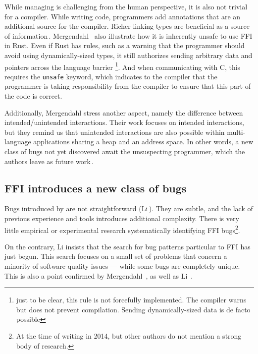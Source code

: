 \documentclass[nomenclature, english, bibtex]{kththesis}
\begin{document}
While managing  is challenging from the human perspective, it is also not trivial for a compiler. While writing code, programmers add annotations that are an additional source for the compiler. Richer linking types are beneficial as a source of information\,\cite{patterson_linking_2017}. Mergendahl \etal\,\cite{mergendahl_cross-language_2022} also illustrate how it is inherently unsafe to use FFI in Rust. Even if Rust has rules, such as a warning that the programmer should avoid using dynamically-sized types, it still authorizes sending arbitrary data and pointers across the language barrier \footnote{just to be clear, this rule is not forcefully implemented. The compiler warns but does not prevent compilation. Sending dynamically-sized data is de facto possible}. 
And when communicating with C, this requires the \texttt{unsafe} keyword, which indicates to the compiler that the programmer is taking responsibility from the compiler to ensure that this part of the code is correct.

Additionally, Mergendahl \etal stress another aspect, namely the difference between intended/unintended interactions. Their work focuses on intended interactions, but they remind us that unintended interactions are also possible within multi-language applications sharing a heap and an address space. In other words, a new class of bugs not yet discovered await the unsuspecting programmer, which the authors leave as future work\,\cite{mergendahl_cross-language_2022}.

\subsection{FFI introduces a new class of bugs}

Bugs introduced by  are not straightforward (Li\,\cite{li_improving_2014}). They are subtle, and the lack of previous experience and tools introduces additional complexity. There is very little empirical or experimental research systematically identifying FFI bugs\footnote{At the time of writing in 2014, but other authors do not mention a strong body of research.}.

On the contrary, Li insists that the search for bug patterns particular to FFI has just begun. This search focuses on a small set of problems that concern a minority of software quality issues --- while some bugs are completely unique. This is also a point confirmed by Mergendahl \etal\,\cite{mergendahl_cross-language_2022}, as well as Li \etal\,\cite{li_detecting_2022}.
\end{document}
